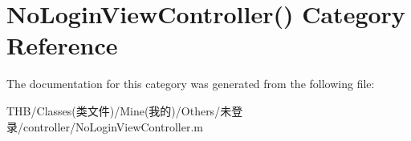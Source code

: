 \hypertarget{category_no_login_view_controller_07_08}{}\section{No\+Login\+View\+Controller() Category Reference}
\label{category_no_login_view_controller_07_08}


The documentation for this category was generated from the following file\+:\begin{DoxyCompactItemize}
\item 
T\+H\+B/\+Classes(类文件)/\+Mine(我的)/\+Others/未登录/controller/No\+Login\+View\+Controller.\+m\end{DoxyCompactItemize}
